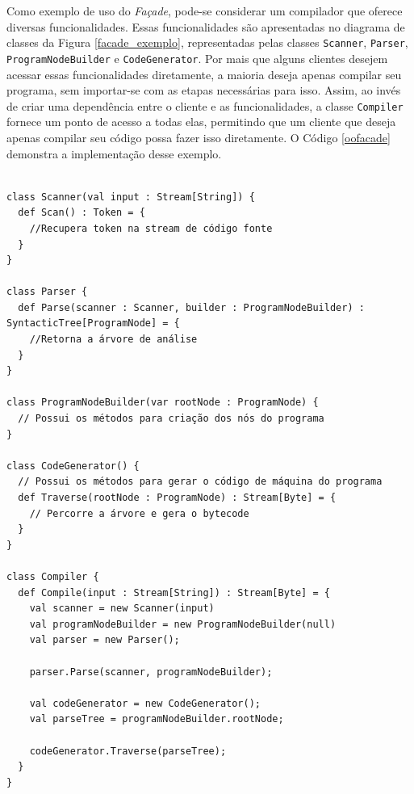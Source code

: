 Como exemplo de uso do \textit{Façade}, pode-se considerar 
um compilador que oferece diversas funcionalidades. 
Essas funcionalidades são apresentadas no diagrama 
de classes da Figura \ref{facade_exemplo}, representadas 
pelas classes \texttt{Scanner}, \texttt{Parser}, \texttt{ProgramNodeBuilder} e 
\texttt{CodeGenerator}. Por mais que alguns clientes desejem 
acessar essas funcionalidades diretamente, a maioria 
deseja apenas compilar seu programa, sem importar-se 
com as etapas necessárias para isso. Assim, ao invés de 
criar uma dependência entre o cliente e as 
funcionalidades, a classe \texttt{Compiler} fornece um ponto 
de acesso a todas elas, permitindo que um cliente 
que deseja apenas compilar seu código possa fazer 
isso diretamente. O Código \ref{oofacade} demonstra 
a implementação desse exemplo.

\begin{lstlisting}[caption={\textit{Façade} Orientado a Objetos.},label=oofacade]

class Scanner(val input : Stream[String]) {
  def Scan() : Token = {
    //Recupera token na stream de código fonte
  }
}

class Parser {
  def Parse(scanner : Scanner, builder : ProgramNodeBuilder) : SyntacticTree[ProgramNode] = {
    //Retorna a árvore de análise
  }
}

class ProgramNodeBuilder(var rootNode : ProgramNode) {
  // Possui os métodos para criação dos nós do programa
}

class CodeGenerator() {
  // Possui os métodos para gerar o código de máquina do programa
  def Traverse(rootNode : ProgramNode) : Stream[Byte] = {
    // Percorre a árvore e gera o bytecode
  }
}

class Compiler {
  def Compile(input : Stream[String]) : Stream[Byte] = {
    val scanner = new Scanner(input)
    val programNodeBuilder = new ProgramNodeBuilder(null)
    val parser = new Parser();

    parser.Parse(scanner, programNodeBuilder);

    val codeGenerator = new CodeGenerator();
    val parseTree = programNodeBuilder.rootNode;

    codeGenerator.Traverse(parseTree);
  }
}

\end{lstlisting}

